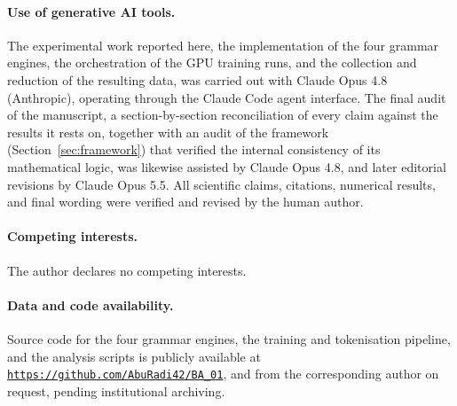\documentclass[11pt, a4paper]{article}
\begin{document}
\paragraph{Use of generative AI tools.}
The experimental work reported here, the implementation of the four grammar
engines, the orchestration of the GPU training runs, and the collection and
reduction of the resulting data, was carried out with Claude Opus 4.8
(Anthropic), operating through the Claude Code agent interface. The final
audit of the manuscript, a section-by-section reconciliation of every claim
against the results it rests on, together with an audit of the framework
(Section~\ref{sec:framework}) that verified the internal consistency of its
mathematical logic, was likewise assisted by Claude Opus 4.8, and later editorial revisions by Claude Opus 5.5. All scientific
claims, citations, numerical results, and final wording were verified and
revised by the human author.

\paragraph{Competing interests.}
The author declares no competing interests.

\paragraph{Data and code availability.}
Source code for the four grammar engines, the training and tokenisation
pipeline, and the analysis scripts is publicly available at
\href{https://github.com/AbuRadi42/BA_01}{\mbox{\nolinkurl{https://github.com/}}\allowbreak\mbox{\nolinkurl{AbuRadi42/BA_01}}}, and from the corresponding author
on request, pending institutional \mbox{archiving}.
\end{document}
